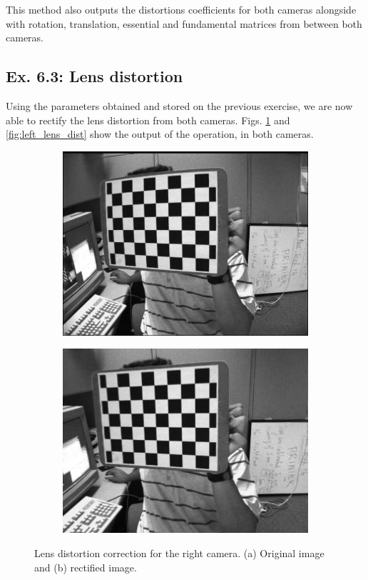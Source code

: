 \documentclass[journal]{IEEEtran}
\begin{document}
This method also outputs the distortions coefficients for both cameras alongside with rotation, translation, essential and fundamental matrices from between both cameras.

\subsection{Ex. 6.3: Lens distortion}

Using the parameters obtained and stored on the previous exercise, we are now able to rectify the lens distortion from both cameras. Figs. \ref{fig:right_lens_dist} and \ref{fig:left_lens_dist} show the output of the operation, in both cameras.

\begin{figure}[htp]
  \centering
  \begin{subfigure}[b]{2.5in}
    \centering
    \includegraphics[width=\textwidth]{imgs/6.3_right_orig.png}
    \caption{}
  \end{subfigure}

  \begin{subfigure}[b]{2.5in}
    \centering
    \includegraphics[width=\textwidth]{imgs/6.3_right_undist.png}
    \caption{}
  \end{subfigure}
  \caption{Lens distortion correction for the right camera. (a) Original image and (b) rectified image.}
  \label{fig:right_lens_dist}
\end{figure}
\end{document}
